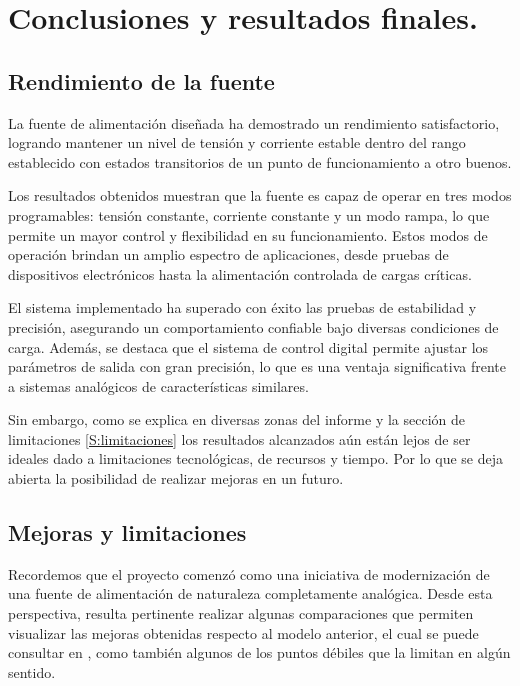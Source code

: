 \chapter{Conclusiones y resultados finales.}

\label{C:Conclusiones y resultados finales.}

\section{Rendimiento de la fuente} 
La fuente de alimentación diseñada ha demostrado un rendimiento satisfactorio, logrando mantener un nivel de tensión y corriente estable dentro del rango establecido con estados transitorios de un punto de funcionamiento a otro buenos. \par
Los resultados obtenidos muestran que la fuente es capaz de operar en tres modos programables: tensión constante, corriente constante y un modo rampa, lo que permite un mayor control y flexibilidad en su funcionamiento. Estos modos de operación brindan un amplio espectro de aplicaciones, desde pruebas de dispositivos electrónicos hasta la alimentación controlada de cargas críticas. \par
El sistema implementado ha superado con éxito las pruebas de estabilidad y precisión, asegurando un comportamiento confiable bajo diversas condiciones de carga. Además, se destaca que el sistema de control digital permite ajustar los parámetros de salida con gran precisión, lo que es una ventaja significativa frente a sistemas analógicos de características similares.\par
Sin embargo, como se explica en diversas zonas del informe y la sección de limitaciones \ref{S:limitaciones} los resultados alcanzados aún están lejos de ser ideales dado a limitaciones tecnológicas, de recursos y tiempo. Por lo que se deja abierta la posibilidad de realizar mejoras en un futuro. \par

\section{Mejoras y limitaciones} 
Recordemos que el proyecto comenzó como una iniciativa de modernización de una fuente de alimentación de naturaleza completamente analógica. Desde esta perspectiva, resulta pertinente realizar algunas comparaciones que permiten visualizar las mejoras obtenidas respecto al modelo anterior, el cual se puede consultar en \cite{Fuente2023}, como también algunos de los puntos débiles que la limitan en algún sentido.\par

